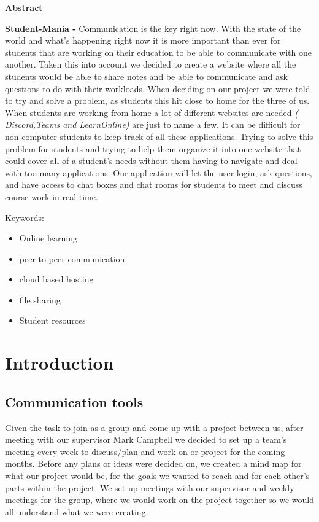 







\hfill \break     
\large
\hfill \break 
\textbf{Abstract} \hfill \break 

\textbf{Student-Mania -} 
Communication is the key right now. With the state of the world and what’s happening right now it is more important than ever for students that are working on their education to be able to communicate with one another. Taken this into account we decided to create a website where all the students would be able to share notes and be able to communicate and ask questions to do with their workloads. When deciding on our project we were told to try and solve a problem, as students this hit close to home for the three of us.   
When students are working from home a lot of different websites are needed \textit{( Discord\cite{ref6},Teams\cite{ref7} and LearnOnline\cite{ref8})} are just to name a few. It can be difficult for non-computer students to keep track of all these applications. Trying to solve this problem for students and trying to help them organize it into one website that could cover all of a student’s needs without them having to navigate and deal with too many applications.  Our application will let the user login, ask questions, and have access to chat boxes and chat rooms for students to meet and discuss course work in real time.   


\hfill \break 

Keywords:

\begin{itemize}
  \item Online learning
  \item peer to peer communication
  \item cloud based hosting
  \item file sharing
  \item Student resources
\end{itemize}

\chapter{Introduction}
\section{Communication tools}

Given the task to join as a group and come up with a project between us, after meeting with our supervisor Mark Campbell we decided to set up a team’s meeting every week to discuss/plan and work on or project for the coming months.
Before any plans or ideas were decided on, we created a mind map for what our project would be, for the goals we wanted to reach and for each other’s parts within the project. We set up meetings with our supervisor and weekly meetings for the group, where  we would work on the project together so we would all understand what we were creating.


